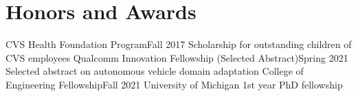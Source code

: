 \section{Honors and Awards}
  \CVSubHeadingListStart
    \CVSubheading
      {CVS Health Foundation Program}{Fall 2017}
      {Scholarship for outstanding children of CVS employees}{}
    \CVSubheading
      {Qualcomm Innovation Fellowship (Selected Abstract)}{Spring 2021}
      {Selected abstract on autonomous vehicle domain adaptation}{}
    \CVSubheading
      {College of Engineering Fellowship}{Fall 2021}
      {University of Michigan 1st year PhD fellowship}{}
  \CVSubHeadingListEnd
